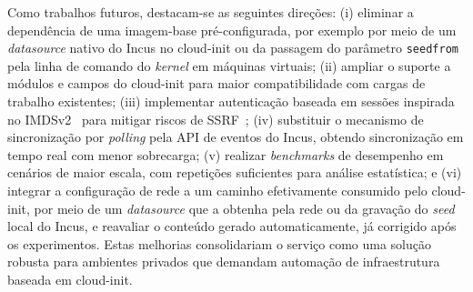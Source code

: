 Como trabalhos futuros, destacam-se as seguintes direções: (i) eliminar a dependência de uma imagem-base pré-configurada, por exemplo por meio de um \textit{datasource} nativo do Incus no cloud-init ou da passagem do parâmetro \texttt{seedfrom} pela linha de comando do \textit{kernel} em máquinas virtuais; (ii) ampliar o suporte a módulos e campos do cloud-init para maior compatibilidade com cargas de trabalho existentes; (iii) implementar autenticação baseada em sessões inspirada no IMDSv2~\citep{aws_imdsv2} para mitigar riscos de SSRF~\citep{mitre_t1552_005}; (iv) substituir o mecanismo de sincronização por \textit{polling} pela API de eventos do Incus, obtendo sincronização em tempo real com menor sobrecarga; (v) realizar \textit{benchmarks} de desempenho em cenários de maior escala, com repetições suficientes para análise estatística; e (vi) integrar a configuração de rede a um caminho efetivamente consumido pelo cloud-init, por meio de um \textit{datasource} que a obtenha pela rede ou da gravação do \textit{seed} local do Incus, e reavaliar o conteúdo gerado automaticamente, já corrigido após os experimentos. Estas melhorias consolidariam o serviço como uma solução robusta para ambientes privados que demandam automação de infraestrutura baseada em cloud-init.
